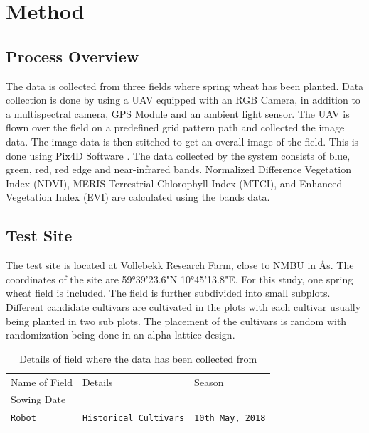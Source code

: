 \documentclass[sigconf, nonacm, natbib, screen, balance=False]{acmart}
\begin{document}
\section{Method}\label{sec:theory}

\subsection{Process Overview}\label{sec:aspect1}

The data is collected from three fields where spring wheat has been planted. Data collection is done by using a UAV equipped with an RGB Camera, in addition to a multispectral camera, GPS Module and an ambient light sensor. The UAV is flown over the field on a predefined grid pattern path and collected the image data. The image data is then stitched to get an overall image of the field. This is done using Pix4D Software \cite{lied}. The data collected by the system consists of blue, green, red, red edge and near-infrared bands. Normalized Difference Vegetation Index (NDVI), MERIS Terrestrial Chlorophyll Index (MTCI), and Enhanced Vegetation Index (EVI) are calculated using the bands data.

\subsection{Test Site}\label{sec:aspect1}

The test site is located at Vollebekk Research Farm, close to NMBU in Ås. The coordinates of the site are 59°39'23.6"N 10°45'13.8"E. For this study, one spring wheat field is included. The field is further subdivided into small subplots. Different candidate cultivars are cultivated in the plots with each cultivar usually being planted in two sub plots. The placement of the cultivars is random with randomization being done in an alpha-lattice design. 


\begin{table}[h!]
  \caption{Details of field where the data has been collected from}
  \label{tab:fields}
  \begin{tabular}{lll}
    \hline
    Name of Field & Details & Season\\Sowing Date \\\hline
    \verb!Robot! & \verb!Historical Cultivars! & \verb!10th May, 2018! \\
  \end{tabular}
\end{table}
\end{document}
